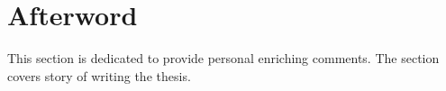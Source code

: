 \begingroup
\let\clearpage\relax
\let\cleardoublepage\relax
\let\cleardoublepage\relax

\chapter{Afterword}

This section is dedicated to provide personal enriching comments. The section covers story of writing the thesis.


\vskip 5cm

\vfill

\endgroup

\vfill